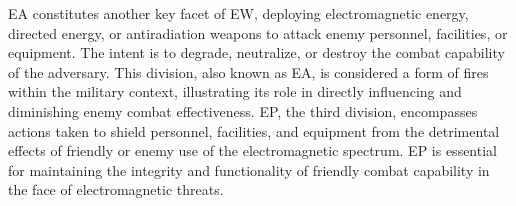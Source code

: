 \documentclass[english, 12pt, a4paper, elec, utf8, a-1b, online]{aaltothesis}
\begin{document}
EA constitutes another key facet of EW, deploying electromagnetic energy, directed energy, or antiradiation weapons to attack enemy personnel, facilities, or equipment. The intent is to degrade, neutralize, or destroy the combat capability of the adversary.
This division, also known as EA, is considered a form of fires within the military context, illustrating its role in directly influencing and diminishing enemy combat effectiveness.
EP, the third division, encompasses actions taken to shield personnel, facilities, and equipment from the detrimental effects of friendly or enemy use of the electromagnetic spectrum. EP is essential for maintaining the integrity and functionality of friendly combat capability in the face of electromagnetic threats.





\end{document}
